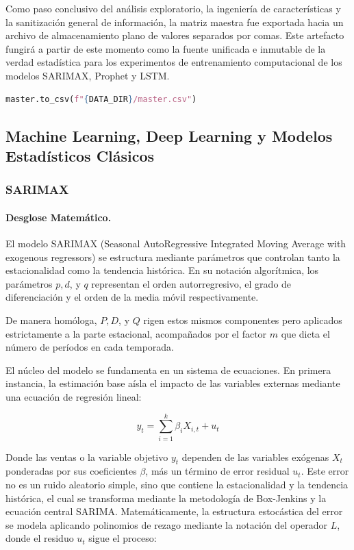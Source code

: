 \documentclass[11pt,a4paper]{report}
\begin{document}
Como paso conclusivo del análisis exploratorio, la ingeniería de características y la sanitización general de información, la matriz maestra fue exportada hacia un archivo de almacenamiento plano de valores separados por comas. Este artefacto fungirá a partir de este momento como la fuente unificada e inmutable de la verdad estadística para los experimentos de entrenamiento computacional de los modelos SARIMAX, Prophet y LSTM.

\begin{lstlisting}[language=Python, caption=Persistencia local del conjunto maestro consolidado.]
master.to_csv(f"{DATA_DIR}/master.csv")
\end{lstlisting}


\subsection{Machine Learning, Deep Learning y Modelos Estadísticos Clásicos}

    \subsubsection{SARIMAX}


        \paragraph{Desglose Matemático.}
        El modelo SARIMAX (Seasonal AutoRegressive Integrated Moving Average with exogenous regressors)
        se estructura mediante parámetros que controlan tanto la estacionalidad como la tendencia histórica.
        En su notación algorítmica, los parámetros $p, d$, y $q$ representan el orden autorregresivo, el grado de
        diferenciación y el orden de la media móvil respectivamente.
        
        De manera homóloga, $P, D$, y $Q$ rigen estos mismos componentes pero aplicados estrictamente a la parte estacional,
        acompañados por el factor $m$ que dicta el número de períodos en cada temporada.

        El núcleo del modelo se fundamenta en un sistema de ecuaciones. En primera instancia, la estimación base aísla
        el impacto de las variables externas mediante una ecuación de regresión lineal:

        $$y_{t}=\sum_{i=1}^{k}\beta_{i}X_{i,t}+u_{t}$$

        Donde las ventas o la variable objetivo $y_{t}$ dependen de las variables exógenas $X_{t}$ ponderadas por sus coeficientes
        $\beta$, más un término de error residual $u_{t}$. Este error no es un ruido aleatorio simple, sino que contiene la
        estacionalidad y la tendencia histórica, el cual se transforma mediante la metodología de Box-Jenkins y la
        ecuación central SARIMA. Matemáticamente, la estructura estocástica del error se modela aplicando polinomios 
        de rezago mediante la notación del operador $L$, donde el residuo $u_{t}$ sigue el proceso:
\end{document}
